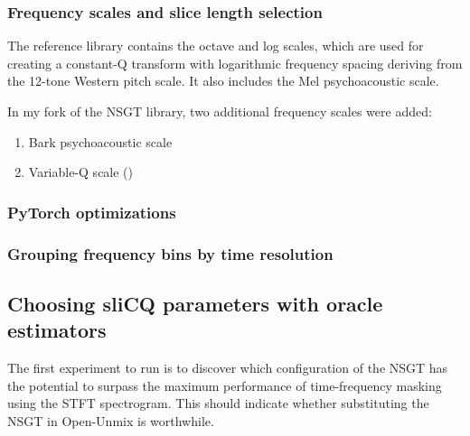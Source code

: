 \documentclass[report.tex]{subfiles}
\begin{document}

\subsubsection{Frequency scales and slice length selection}

The reference library contains the octave and log scales, which are used for creating a constant-Q transform with logarithmic frequency spacing deriving from the 12-tone Western pitch scale. It also includes the Mel psychoacoustic scale.

In my fork of the NSGT library, two additional frequency scales were added:

\begin{enumerate}
	\item
		Bark psychoacoustic scale
	\item
		Variable-Q scale (\cite{variableq1,variableq2})
\end{enumerate}


\subsubsection{PyTorch optimizations}




\subsubsection{Grouping frequency bins by time resolution}


\subsection{Choosing sliCQ parameters with oracle estimators}

The first experiment to run is to discover which configuration of the NSGT has the potential to surpass the maximum performance of time-frequency masking using the STFT spectrogram. This should indicate whether substituting the NSGT in Open-Unmix is worthwhile.
\end{document}
